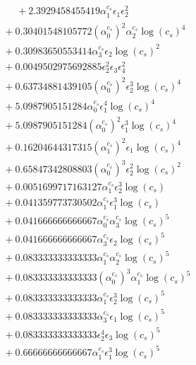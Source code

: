 \documentclass[10pt]{article}
\begin{document}
\begin{align*}
\phantom{F_{s,5}} &\phantom{={}}{}  + 2.3929458455419 \alpha_{1}^{c_s} \epsilon_{1} \epsilon_{2}^{2} \\
&{}  + 0.30401548105772 \left(\alpha_{0}^{c_s}\right)^{2} \alpha_{2}^{c_s} \log{\left(c_{s} \right)}^{4} \\
&{}  + 0.30983650553414 \alpha_{3}^{c_s} \epsilon_{2} \log{\left(c_{s} \right)}^{2} \\
&{}  + 0.0049502975692885 \epsilon_{2}^{2} \epsilon_{3} \epsilon_{4}^{2} \\
&{}  + 0.63734881439105 \left(\alpha_{0}^{c_s}\right)^{2} \epsilon_{2}^{3} \log{\left(c_{s} \right)}^{4} \\
&{}  + 5.0987905151284 \alpha_{0}^{c_s} \epsilon_{1}^{4} \log{\left(c_{s} \right)}^{4} \\
&{}  + 5.0987905151284 \left(\alpha_{0}^{c_s}\right)^{2} \epsilon_{1}^{3} \log{\left(c_{s} \right)}^{4} \\
&{}  + 0.16204644317315 \left(\alpha_{1}^{c_s}\right)^{2} \epsilon_{1} \log{\left(c_{s} \right)}^{4} \\
&{}  + 0.65847342808803 \left(\alpha_{0}^{c_s}\right)^{3} \epsilon_{2}^{2} \log{\left(c_{s} \right)}^{2} \\
&{}  + 0.0051699717163127 \alpha_{1}^{c_s} \epsilon_{2}^{3} \log{\left(c_{s} \right)} \\
&{}  + 0.041359773730502 \alpha_{1}^{c_s} \epsilon_{1}^{3} \log{\left(c_{s} \right)} \\
&{}  + 0.041666666666667 \alpha_{0}^{c_s} \alpha_{3}^{c_s} \log{\left(c_{s} \right)}^{5} \\
&{}  + 0.041666666666667 \alpha_{3}^{c_s} \epsilon_{2} \log{\left(c_{s} \right)}^{5} \\
&{}  + 0.083333333333333 \alpha_{1}^{c_s} \alpha_{2}^{c_s} \log{\left(c_{s} \right)}^{5} \\
&{}  + 0.083333333333333 \left(\alpha_{0}^{c_s}\right)^{3} \alpha_{1}^{c_s} \log{\left(c_{s} \right)}^{5} \\
&{}  + 0.083333333333333 \alpha_{1}^{c_s} \epsilon_{2}^{3} \log{\left(c_{s} \right)}^{5} \\
&{}  + 0.083333333333333 \alpha_{3}^{c_s} \epsilon_{1} \log{\left(c_{s} \right)}^{5} \\
&{}  + 0.083333333333333 \epsilon_{2}^{4} \epsilon_{3} \log{\left(c_{s} \right)}^{5} \\
&{}  + 0.66666666666667 \alpha_{1}^{c_s} \epsilon_{1}^{3} \log{\left(c_{s} \right)}^{5} \\

\end{align*}
\end{document}
